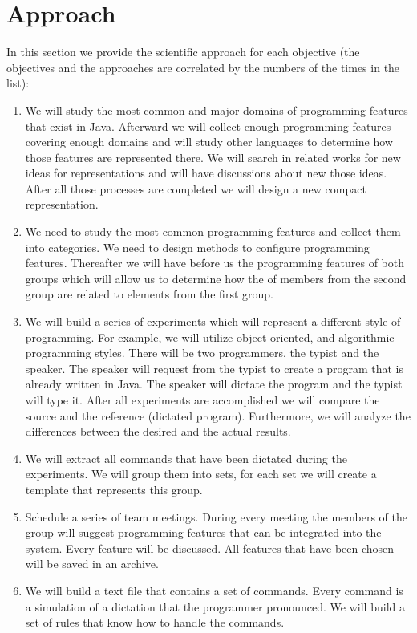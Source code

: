 \section{Approach}
In this section we provide the scientific approach for each objective (the objectives and the approaches are correlated by the numbers of the times in the list):
\begin{enumerate}
	\item We will study the most common and major domains of programming features that exist in Java. Afterward we will collect enough programming features covering enough domains and will study other languages to determine how those features are represented there. We will search in related works for new ideas for representations and will have discussions about new those ideas. After all those processes are completed we will design a new compact representation.
	\item We need to study the most common programming features and collect them into categories. We need to design methods to configure programming features. Thereafter we will have before us the programming features of both groups which will allow us to determine how the of members from the second group are related to  elements from the first group.
	\item We will build a series of experiments which will represent a different style of programming. For example, we will utilize object oriented, and algorithmic programming styles. There will be two programmers, the typist and the speaker. The speaker will request from the typist to create a program that is already written in Java. The speaker will dictate the program and the typist will type it. After all experiments are accomplished we will compare the source and the reference (dictated program). Furthermore, we will analyze the differences between the desired and the actual results.
	\item We will extract all commands that have been dictated during the experiments. We will group them into sets, for each set we will create a template that represents this group.
	\item Schedule a series of team meetings. During every meeting the members of the group will suggest programming features that can be integrated into the system. Every feature will be discussed. All features that have been chosen will be saved in an archive.
	\item We will build a text file that contains a set of commands. Every command is a simulation of a dictation that the programmer pronounced. We will build a set of rules that know how to handle the commands.
\end{enumerate}
